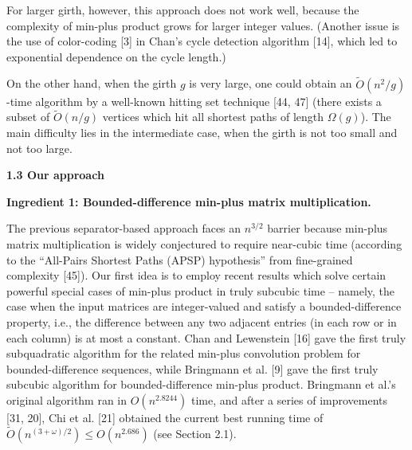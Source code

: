 \documentclass[10pt,a4paper]{article}
\begin{document}
\par
\par
For larger girth, however, this approach does not work well, because the complexity of min-plus product grows for larger integer values. (Another issue is the use of color-coding [3] in Chan’s cycle detection algorithm [14], which led to exponential dependence on the cycle length.)
\par
\par
On the other hand, when the girth $g$ is very large, one could obtain an $\widetilde{O}(n^{2}/g)$-time algorithm by a well-known hitting set technique [44, 47] (there exists a subset of $\widetilde{O}(n/g)$ vertices which hit all shortest paths of length $\Omega(g)$). The main difficulty lies in the intermediate case, when the girth is not too small and not too large.
\par
\par
\par\medskip\noindent\textbf{1.3 Our approach}\par
\par\medskip\noindent\textbf{Ingredient 1: Bounded-difference min-plus matrix multiplication.}\par
The previous separator-based approach faces an $n^{3/2}$ barrier because min-plus matrix multiplication is widely conjectured to require near-cubic time (according to the “All-Pairs Shortest Paths (APSP) hypothesis” from fine-grained complexity [45]). Our first idea is to employ recent results which solve certain powerful special cases of min-plus product in truly subcubic time – namely, the case when the input matrices are integer-valued and satisfy a bounded-difference property, i.e., the difference between any two adjacent entries (in each row or in each column) is at most a constant. Chan and Lewenstein [16] gave the first truly subquadratic algorithm for the related min-plus convolution problem for bounded-difference sequences, while Bringmann et al. [9] gave the first truly subcubic algorithm for bounded-difference min-plus product. Bringmann et al.’s original algorithm ran in $O(n^{2.8244})$ time, and after a series of improvements [31, 20], Chi et al. [21] obtained the current best running time of $\widetilde{O}(n^{(3+\omega)/2})\leq O(n^{2.686})$ (see Section 2.1).
\par
\par
\end{document}
